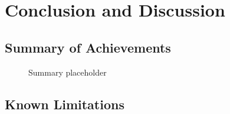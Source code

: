 \chapter{Conclusion and Discussion}
\label{chap:conclusion-discussion}

\section{Summary of Achievements}
\label{section:summary-of-achievements}

\begin{figure}[h]
    \centering
    \caption{Summary placeholder}
    \label{fig:summary-placeholder}
\end{figure}

\section{Known Limitations}
\label{section:limitations}

